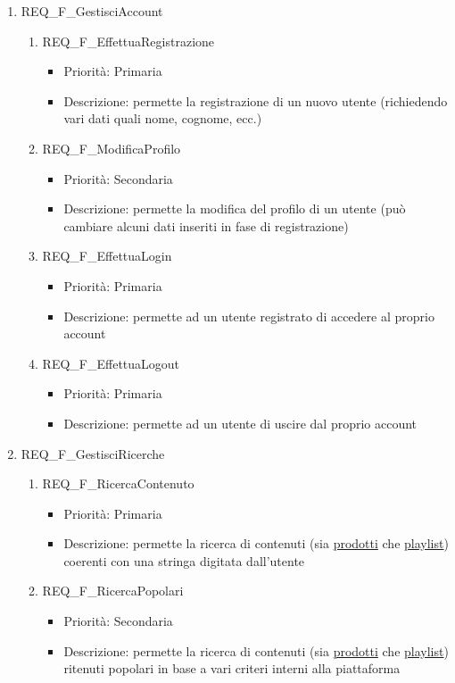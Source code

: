\begin{enumerate}
	\item REQ\_F\_GestisciAccount
		\begin{enumerate}[label*=\arabic*.]
		\item REQ\_F\_EffettuaRegistrazione	
			\begin{itemize}	
			\item Priorità: Primaria
			\item Descrizione: permette la registrazione di un nuovo utente (richiedendo vari dati quali nome, cognome, ecc.)
			\end{itemize}
		\item REQ\_F\_ModificaProfilo
			\begin{itemize}	
			\item Priorità: Secondaria
			\item Descrizione: permette la modifica del profilo di un utente (può cambiare alcuni dati inseriti in fase di registrazione)
			\end{itemize}

		\item REQ\_F\_EffettuaLogin
			\begin{itemize}	
			\item Priorità: Primaria
			\item Descrizione: permette ad un utente registrato di accedere al proprio account
			\end{itemize}

		\item REQ\_F\_EffettuaLogout
			\begin{itemize}	
			\item Priorità: Primaria
			\item Descrizione: permette ad un utente di uscire dal proprio account
			\end{itemize}
		\end{enumerate}

	\item REQ\_F\_GestisciRicerche
		\begin{enumerate}[label*=\arabic*.]
		\item REQ\_F\_RicercaContenuto
			\begin{itemize}	
			\item Priorità: Primaria
			\item Descrizione: permette la ricerca di contenuti (sia \hyperlink{AnReqProdMult}{prodotti} che \hyperlink{AnReqPlaylist}{playlist}) coerenti con una stringa digitata dall'utente
			\end{itemize}
		\item REQ\_F\_RicercaPopolari
			\begin{itemize}
			\item Priorità: Secondaria
			\item Descrizione: permette la ricerca di contenuti (sia \hyperlink{AnReqProdMult}{prodotti} che \hyperlink{AnReqPlaylist}{playlist}) ritenuti popolari in base a vari criteri interni alla piattaforma 
			\end{itemize}	
		

\end{enumerate}
\end{enumerate}
